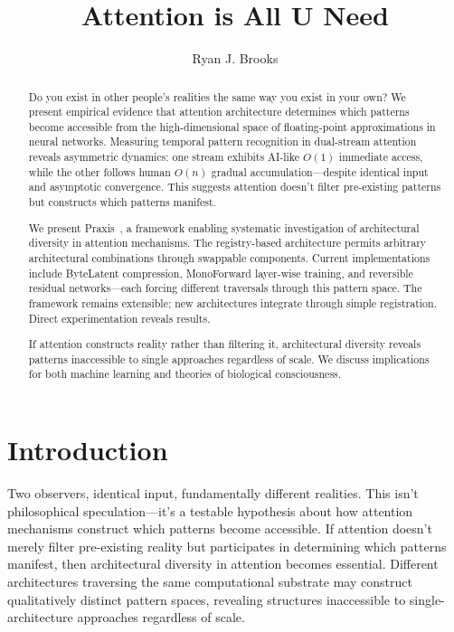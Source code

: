 \documentclass{article}
\begin{document}
\title{Attention is All U Need}
\author{Ryan J. Brooks}
\date{}

\maketitle

\begin{abstract}
    Do you exist in other people's realities the same way you exist in your own? We present empirical evidence that attention architecture determines which patterns become accessible from the high-dimensional space of floating-point approximations in neural networks. Measuring temporal pattern recognition in dual-stream attention reveals asymmetric dynamics: one stream exhibits AI-like $O(1)$ immediate access, while the other follows human $O(n)$ gradual accumulation—despite identical input and asymptotic convergence. This suggests attention doesn't filter pre-existing patterns but constructs which patterns manifest.

    We present Praxis~\cite{praxis2025}, a framework enabling systematic investigation of architectural diversity in attention mechanisms. The registry-based architecture permits arbitrary architectural combinations through swappable components. Current implementations include ByteLatent compression, MonoForward layer-wise training, and reversible residual networks—each forcing different traversals through this pattern space. The framework remains extensible; new architectures integrate through simple registration. Direct experimentation reveals results.

    If attention constructs reality rather than filtering it, architectural diversity reveals patterns inaccessible to single approaches regardless of scale. We discuss implications for both machine learning and theories of biological consciousness.
\end{abstract}

\section{Introduction}

Two observers, identical input, fundamentally different realities. This isn't philosophical speculation—it's a testable hypothesis about how attention mechanisms construct which patterns become accessible. If attention doesn't merely filter pre-existing reality but participates in determining which patterns manifest, then architectural diversity in attention becomes essential. Different architectures traversing the same computational substrate may construct qualitatively distinct pattern spaces, revealing structures inaccessible to single-architecture approaches regardless of scale.
\end{document}
